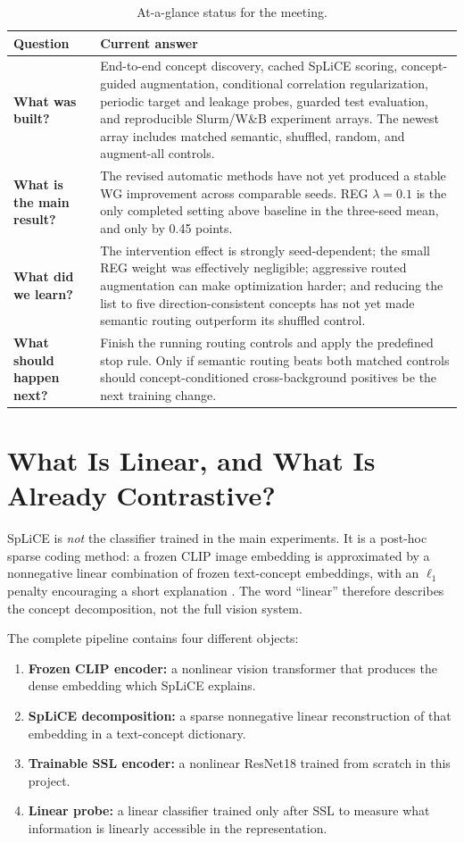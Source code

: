 \documentclass[11pt,a4paper]{article}
\begin{document}
\begin{table}[ht]
\centering
\caption{At-a-glance status for the meeting.}
\begin{tabularx}{\textwidth}{>{\bfseries}p{} X}
\toprule
Question & Current answer \\
\midrule
What was built? & End-to-end concept discovery, cached SpLiCE scoring,
concept-guided augmentation, conditional correlation regularization, periodic
target and leakage probes, guarded test evaluation, and reproducible Slurm/W\&B
experiment arrays. The newest array includes matched semantic, shuffled,
random, and augment-all controls. \\
What is the main result? & The revised automatic methods have not yet produced
a stable WG improvement across comparable seeds. REG $\lambda=0.1$ is the only
completed setting above baseline in the three-seed mean, and only by 0.45 points. \\
What did we learn? & The intervention effect is strongly seed-dependent; the
small REG weight was effectively negligible; aggressive routed augmentation can
make optimization harder; and reducing the list to five direction-consistent
concepts has not yet made semantic routing outperform its shuffled control. \\
What should happen next? & Finish the running routing controls and apply the
predefined stop rule. Only if semantic routing beats both matched controls
should concept-conditioned cross-background positives be the next training change. \\
\bottomrule
\end{tabularx}
\end{table}

\section{What Is Linear, and What Is Already Contrastive?}

SpLiCE is \emph{not} the classifier trained in the main experiments. It is a
post-hoc sparse coding method: a frozen CLIP image embedding is approximated by
a nonnegative linear combination of frozen text-concept embeddings, with an
$\ell_1$ penalty encouraging a short explanation \cite{bhalla2024splice}. The
word ``linear'' therefore describes the concept decomposition, not the full
vision system.

The complete pipeline contains four different objects:
\begin{enumerate}
    \item \textbf{Frozen CLIP encoder:} a nonlinear vision transformer that
    produces the dense embedding which SpLiCE explains.
    \item \textbf{SpLiCE decomposition:} a sparse nonnegative linear
    reconstruction of that embedding in a text-concept dictionary.
    \item \textbf{Trainable SSL encoder:} a nonlinear ResNet18 trained from
    scratch in this project.
    \item \textbf{Linear probe:} a linear classifier trained only after SSL to
    measure what information is linearly accessible in the representation.
\end{enumerate}
\end{document}
